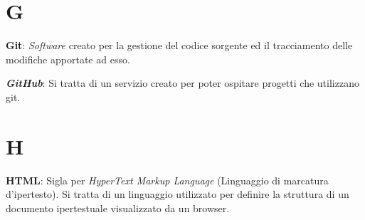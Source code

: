 \documentclass[5pt]{article}
\begin{document}
\pagebreak

\section*{G}
\begin{flushleft}

\textbf{Git}: \textit{Software} creato per la gestione del codice sorgente ed il tracciamento delle modifiche apportate ad esso.\newline

\textbf{\textit{GitHub}}: Si tratta di un servizio creato per poter ospitare progetti che utilizzano git.

\end{flushleft}

\pagebreak

\section*{H}
\begin{flushleft}

\textbf{HTML}: Sigla per \textit{HyperText Markup Language} (Linguaggio di marcatura d'ipertesto). Si tratta di un linguaggio utilizzato per definire la struttura di un documento ipertestuale visualizzato da un browser.

\end{flushleft}

\pagebreak
\end{document}
